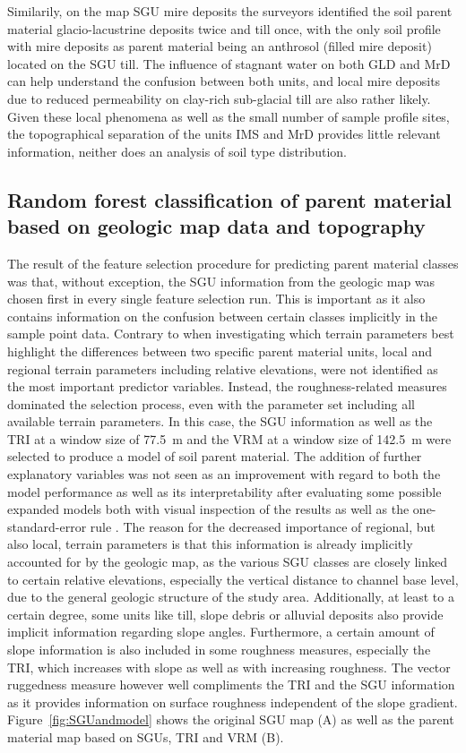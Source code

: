 \documentclass[preprint,12pt,authoryear]{elsarticle}
\begin{document}
Similarily, on the map SGU mire deposits the surveyors identified the soil parent material glacio-lacustrine deposits twice and till once, with the only soil profile with mire deposits as parent material being an anthrosol (filled mire deposit) located on the SGU till. The influence of stagnant water on both GLD and MrD can help understand the confusion between both units, and local mire deposits due to reduced permeability on clay-rich sub-glacial till are also rather likely. Given these local phenomena as well as the small number of sample profile sites, the topographical separation of the units IMS and MrD provides little relevant information, neither does an analysis of soil type distribution.
 
\subsection{Random forest classification of parent material based on geologic map data and topography}
The result of the feature selection procedure for predicting parent material classes was that, without exception, the SGU information from the geologic map was chosen first in every single feature selection run. This is important as it also contains information on the confusion between certain classes implicitly in the sample point data. Contrary to when investigating which terrain parameters best highlight the differences between two specific parent material units, local and regional terrain parameters including relative elevations, were not identified as the most important predictor variables. Instead, the roughness-related measures dominated the selection process, even with the parameter set including all available terrain parameters. In this case, the SGU information as well as the TRI at a window size of 77.5~m and the VRM at a window size of 142.5~m were selected to produce a model of soil parent material. The addition of further explanatory variables was not seen as an  improvement with regard to both the model performance as well as its interpretability after evaluating some possible expanded models both with visual inspection of the results as well as the one-standard-error rule \citep{James2013}.  The reason for the decreased importance of regional, but also local, terrain parameters is that this information is already implicitly accounted for by the geologic map, as the various SGU classes are closely linked to certain relative elevations, especially the vertical distance to channel base level, due to the general geologic structure of the study area. Additionally, at least to a certain degree, some units like till, slope debris or alluvial deposits also provide implicit information regarding slope angles. Furthermore, a certain amount of slope information is also included in some roughness measures, especially the TRI, which increases with slope as well as with increasing roughness. The vector ruggedness measure however well compliments the TRI and the SGU information as it provides information on surface roughness independent of the slope gradient. Figure~\ref{fig:SGUandmodel} shows the original SGU map (A) as well as the parent material map based on SGUs, TRI and VRM (B).
\end{document}
